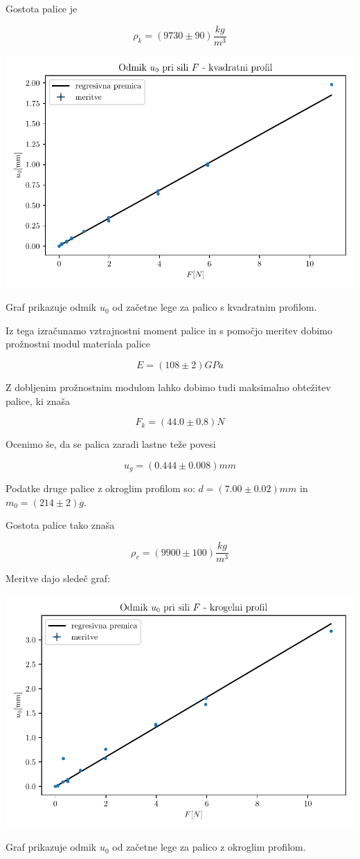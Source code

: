 \documentclass[12pt]{report}
\begin{document}
Gostota palice je 

\[ 
\rho_k = (9730 \pm 90) \frac{kg}{m^3}
\]

\begin{slika}[H]
  \centering
  \includegraphics{kvader}
  \caption{\small Graf prikazuje odmik $u_0$ od začetne lege za palico s kvadratnim profilom. }
\end{slika}

Iz tega izračunamo vztrajnostni moment palice in s pomočjo meritev dobimo prožnostni modul materiala palice 

\[ 
E = (108 \pm 2)GPa 
\]

Z dobljenim prožnostnim modulom lahko dobimo tudi maksimalno obtežitev palice, ki znaša 

\[
F_k = (44.0 \pm  0.8)N
\]

Ocenimo še, da se palica zaradi lastne teže povesi

\[
u_g=(0.444 \pm 0.008)mm  
\]

Podatke druge palice z okroglim profilom so: $d = (7.00 \pm 0.02)mm$ in $m_0 = (214 \pm 2)g$. 

Gostota palice tako znaša 

\[
\rho_v = (9900 \pm  100) \frac{kg}{m^3}
\]

Meritve dajo sledeč graf: 

\begin{slika}[H]
  \centering
  \includegraphics{valj}
  \caption{\small Graf prikazuje odmik $u_0$ od začetne lege za palico z okroglim profilom. }
\end{slika}
\end{document}
